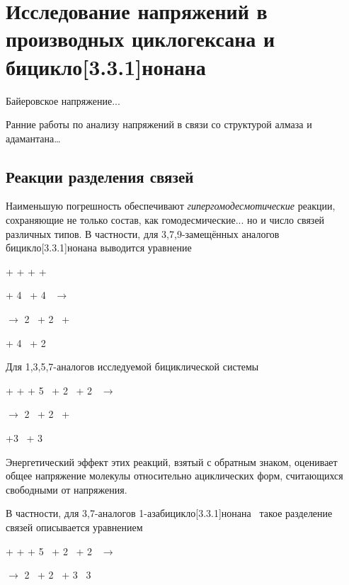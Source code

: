 \chapter{Исследование напряжений в производных циклогексана и бицикло[3.3.1]нонана}\label{ch:Strain:331}

Байеровское напряжение...

Ранние работы по анализу напряжений в связи со структурой алмаза и адамантана\dots~\cite{Mohr:1918}

\section{Реакции разделения связей} 

Наименьшую погрешность обеспечивают \emph{гипергомодесмотические} реакции, сохраняющие не только состав, как гомодесмические... но и число связей различных типов. В частности, для 3,7,9-замещённых аналогов бицикло[3.3.1]нонана выводится уравнение
\begin{center}
 + \DrawMeXMe{} + \DrawMeYMe{} + \DrawMeZMe{} +

+ 4~\DrawPropane{} + 4~\DrawIsoButane{}
  \(\longrightarrow\)
  
\(\longrightarrow\) 2~ + 2~ +

+ 4~\DrawIsoPentane{} + 2~
\end{center}

Для 1,3,5,7-аналогов исследуемой бициклической системы
\begin{center}
   + \DrawMeXMe{} + \DrawMeYMe{} + 5~\DrawPropane{} + 2~ + 2~
  \(\longrightarrow\)
  
  \(\longrightarrow\) 2~ + 2~ +
  
  +3~ + 3~
\end{center}

Энергетический эффект этих реакций, взятый с обратным знаком, оценивает общее напряжение молекулы относительно ациклических форм, считающихся свободными от напряжения. 

В частности, для 3,7-аналогов 1-азабицикло[3.3.1]нонана~ такое разделение связей описывается уравнением
\begin{center}
  + \DrawMeXMe{} + \DrawMeYMe{} + 5~\DrawPropane{}
  + 2~\DrawIsoButane{} + 2~\DrawMeNMeMe{}
  \(\longrightarrow\)
  
  \(\longrightarrow\) 
  2~ + 2~ + 3~\DrawIsoPentane{}
  3~\DrawMeNMeEt{}
\end{center}

